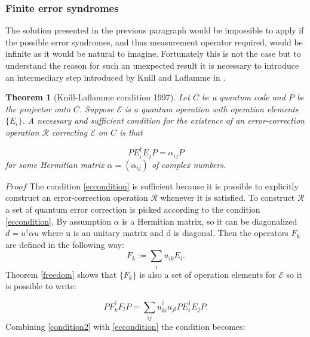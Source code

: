 \documentclass{article}
\newtheorem{theorem}{Theorem}
\begin{document}
\subsubsection{Finite error syndromes}

The solution presented in the previous paragraph would be impossible to
apply if the possible error syndromes, and thus measurement operator required, would be
infinite as it would be natural to imagine.
Fortunately this is not the case but to understand the reason for such
an unexpected result it is necessary to introduce an intermediary step introduced
by Knill and Laflamme in \cite{knill1997theory}.

\begin{theorem}[Knill-Laflamme condition 1997]
	\label{conditions}
	Let $C$ be a quantum code and $P$ be the projector onto $C$.
	Suppose $\mathcal{E}$ is a quantum operation with operation elements $\{E_i\}$.
	A necessary and sufficient condition for the existence of an error-correction
	operation $\mathcal{R}$ correcting $\mathcal{E}$ on $C$ is that

	\begin{equation}
		P E_i^\dagger E_j P = \alpha_{ij} P
		\label{eccondition}
	\end{equation}
	for some Hermitian matrix $\alpha = (\alpha_{ij})$ of complex numbers.
\end{theorem}


\noindent $Proof$ \hspace{10pt}
The condition \ref{eccondition} is sufficient because it
is possible to explicitly construct an error-correction operation
$\mathcal{R}$ whenever it is satisfied.
To construct $\mathcal{R}$ a set of quantum error correction is picked
according to the condition \ref{eccondition}.
By assumption $\alpha$ is a Hermitian matrix, so it can be diagonalized
$d =u^\dagger \alpha u$ where u is an unitary matrix and d is diagonal.
Then the operators $F_k$ are defined in the following way:
\begin{equation}
	F_k := \sum_i u_{ik} E_i.
\end{equation}
Theorem \ref{freedom} shows that $\{F_k\}$ is also a set of operation
elements for $\mathcal{E}$ so it is possible to write:

\begin{equation}
	\label{condition2}
	P F_k^\dagger F_l P = \sum_{ij} u_{ki}^\dagger u_{jl} P E_{i}^\dagger E_j P.
\end{equation}
Combining \ref{condition2} with \ref{eccondition}
the condition becomes:
\end{document}
